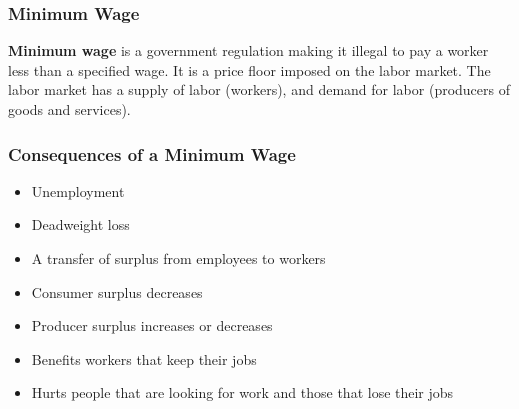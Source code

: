 \documentclass{article}
\begin{document}
\subsubsection{Minimum Wage}
\textbf{Minimum wage} is a government regulation making it illegal to pay a
worker less than a specified wage. It is a price floor imposed on the labor
market. The labor market has a supply of labor (workers), and demand for labor
(producers of goods and services).

\subsubsection{Consequences of a Minimum Wage}
\begin{itemize}
  \item Unemployment
  \item Deadweight loss
  \item A transfer of surplus from employees to workers
  \item Consumer surplus decreases
  \item Producer surplus increases or decreases
  \item Benefits workers that keep their jobs
  \item Hurts people that are looking for work and those that lose their jobs
\end{itemize}
\end{document}
